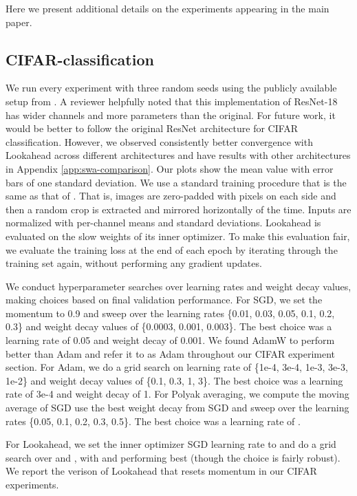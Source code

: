 \documentclass{article}
\begin{document}
Here we present additional details on the experiments appearing in the main paper. 

\subsection{CIFAR-classification}
We run every experiment with three random seeds using the publicly available setup from \citep{devries2017improved}. A reviewer helpfully noted that this implementation of ResNet-18 has wider channels and more parameters than the original. For future work, it would be better to follow the original ResNet architecture for CIFAR classification. However, we observed consistently better convergence with Lookahead across different architectures and have results with other architectures in Appendix \ref{app:swa-comparison}. Our plots show the mean value with error bars of one standard deviation. We use a standard training procedure that is the same as that of \citet{Zagoruyko2016WRN}. That is, images are zero-padded with  pixels on each side and then a random  crop is extracted and mirrored horizontally  of the time. Inputs are normalized with per-channel means and standard deviations. Lookahead is evaluated on the slow weights of its inner optimizer. To make this evaluation fair, we evaluate the training loss at the end of each epoch by iterating through the training set again, without performing any gradient updates.

We conduct hyperparameter searches over learning rates and weight decay values, making choices based on final validation performance. For SGD, we set the momentum to 0.9 and sweep over the learning rates \{0.01, 0.03, 0.05, 0.1, 0.2, 0.3\} and weight decay values of \{0.0003, 0.001, 0.003\}. The best choice was a learning rate of 0.05 and weight decay of 0.001. We found AdamW \citep{loshchilov2017fixing} to perform better than Adam and refer it to as Adam throughout our CIFAR experiment section. For Adam, we do a grid search on learning rate of \{1e-4, 3e-4, 1e-3, 3e-3, 1e-2\} and weight decay values of \{0.1, 0.3, 1, 3\}. The best choice was a learning rate of 3e-4 and weight decay of 1. For Polyak averaging, we compute the moving average of SGD use the best weight decay from SGD and sweep over the learning rates \{0.05, 0.1, 0.2, 0.3, 0.5\}. The best choice was a learning rate of .

For Lookahead, we set the inner optimizer SGD learning rate to  and do a grid search over  and , with  and  performing best (though the choice is fairly robust). We report the verison of Lookahead that resets momentum in our CIFAR experiments. 
\end{document}
